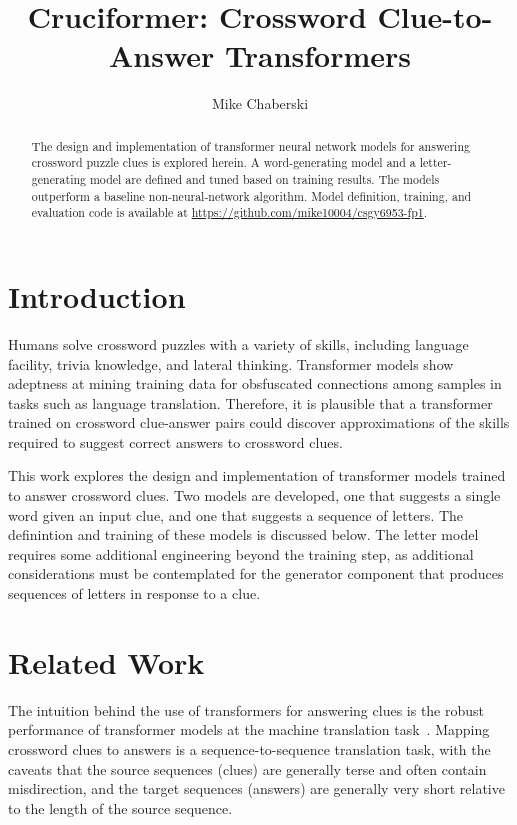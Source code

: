 \documentclass[letterpaper]{article} %
\title{Cruciformer: Crossword Clue-to-Answer Transformers}
\author {
    Mike Chaberski
}
\begin{document}
\maketitle

\begin{abstract}
    The design and implementation of transformer neural network models for answering crossword puzzle clues is explored herein.
    A word-generating model and a letter-generating model are defined and tuned based on training results.
    The models outperform a baseline non-neural-network algorithm.
    Model definition, training, and evaluation code is available at \url{https://github.com/mike10004/csgy6953-fp1}.
\end{abstract}

\begin{NoHyper}

\section{Introduction}
\label{sec:intro}

Humans solve crossword puzzles with a variety of skills, including language facility, trivia knowledge, and lateral thinking.
Transformer models show adeptness at mining training data for obsfuscated connections among samples in tasks such as language translation.
Therefore, it is plausible that a transformer trained on crossword clue-answer pairs could discover approximations of the
skills required to suggest correct answers to crossword clues.

This work explores the design and implementation of transformer models trained to answer crossword clues.
Two models are developed, one that suggests a single word given an input clue, and one that suggests a
sequence of letters.
The definintion and training of these models is discussed below.
The letter model requires some additional engineering beyond the training step, as
additional considerations must be contemplated for the generator component that produces
sequences of letters in response to a clue.

\section{Related Work}
\label{sec:related}

The intuition behind the use of transformers for answering clues is the robust performance of transformer models at the machine translation task~\cite{vaswani2017}. Mapping crossword clues to answers is a sequence-to-sequence translation task, with the caveats that the source sequences (clues) are generally terse and often contain misdirection, and the target sequences (answers) are generally very short relative to the length of the source sequence.


\end{NoHyper}
\end{document}
